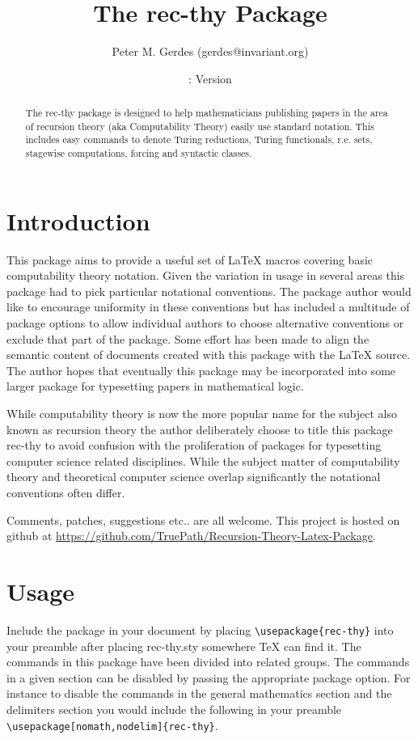 \documentclass[leqno,11pt]{amsart}
\title{The rec-thy Package}
\author{Peter M. Gerdes (gerdes@invariant.org)}
\date{\DateOfPackage{rec-thy}: Version \recthyVersion}
\begin{document}
\begin{abstract}
\noindent The rec-thy package is designed to help mathematicians publishing papers in the area of recursion theory (aka Computability Theory) easily use standard notation.  This includes easy commands to denote Turing reductions, Turing functionals, r.e. sets, stagewise computations, forcing and syntactic classes.
\end{abstract}



\maketitle




\section{Introduction}
This package aims to provide a useful set of \LaTeX { }macros covering basic computability theory notation.  Given the variation in usage in several areas this package had to pick particular notational conventions.  The package author would like to encourage uniformity in these conventions but has included a multitude of package options to allow individual authors to choose alternative conventions or exclude that part of the package.  Some effort has been made to align the semantic content of documents created with this package with the \LaTeX { }source.  The author hopes that eventually this package may be incorporated into some larger package for typesetting papers in mathematical logic.

While computability theory is now the more popular name for the subject also known as recursion theory the author deliberately choose to title this package rec-thy to avoid confusion with the proliferation of packages for typesetting computer science related disciplines.  While the subject matter of computability theory and theoretical computer science overlap significantly the notational conventions often differ.

Comments, patches, suggestions etc.. are all welcome.  This project is hosted on github at \href{https://github.com/TruePath/Recursion-Theory-Latex-Package}{https://github.com/TruePath/Recursion-Theory-Latex-Package}.

\section{Usage}
Include the package in your document by placing \verb=\usepackage{rec-thy}= into your preamble after placing rec-thy.sty somewhere \TeX{ } can find it.  The commands in this package have been divided into related groups.  The commands in a given section can be disabled by passing the appropriate package option.  For instance to disable the commands in the general mathematics section and the delimiters section you would include the following in your preamble \verb=\usepackage[nomath,nodelim]{rec-thy}=.
\end{document}
